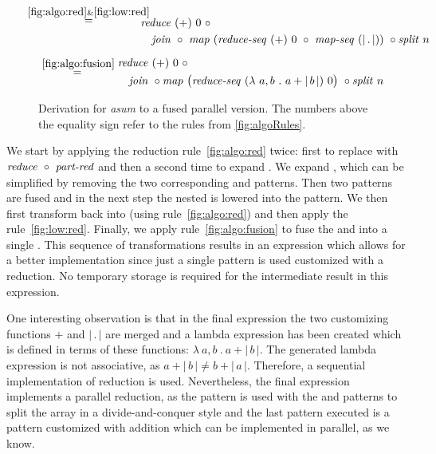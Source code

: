 \begin{figure*}[t]
\begin{align*}
\begin{aligned}
  & \overset{\hspace{-1.3em}\ref{fig:algo:red}\& \ref{fig:low:red}\hspace{-1.1em}}{=\hspace{.2em}}
      \begin{aligned}
        &\\[.5em]
        & \reduce\ (+)\ 0\ \circ\\
        &\quad \join\ \circ\ \map\ (\reduceSeq\ (+)\ 0\ \circ\ \mapSeq\ (|\, .\, |))\ \circ \splitN\ n
      \end{aligned}\\[.5em]
  & \overset{\ref{fig:algo:fusion}}{=\hspace{.2em}}
      \begin{aligned}
        & \reduce\ (+)\ 0\ \circ\\
        &\quad  \join\ \circ \map\ \big(\reduceSeq\ (\lambda\ a, b\ .\ a+|\, b\, |)\ 0\big)\ \circ \splitN\ n
      \end{aligned}
  \end{aligned}
\end{align*}
\caption[Derivation of \emph{asum} to a fused parallel version]{Derivation for \emph{asum} to a fused parallel version.
  The numbers above the equality sign refer to the rules from \autoref{fig:algoRules}.
}
\label{fig:derivation}
\end{figure*}


We start by applying the reduction rule~\ref{fig:algo:red} twice:
first to replace \reduce with $\text{\textit{reduce}}\ \circ\ \text{\textit{part-red}}$ and then a second time to expand \partRed.
We expand \map, which can be simplified by removing the two corresponding \join and \splitN patterns.
Then two \map patterns are fused and in the next step the nested \map is lowered into the \mapSeq pattern.
We then first transform \partRed back into \reduce (using rule~\ref{fig:algo:red}) and then apply the \OpenCL rule~\ref{fig:low:red}.
Finally, we apply rule~\ref{fig:algo:fusion} to fuse the \mapSeq and \reduceSeq into a single \reduceSeq.
This sequence of transformations results in an expression which allows for a better \OpenCL implementation since just a single \map pattern is used customized with a reduction.
No temporary storage is required for the intermediate result in this expression.

One interesting observation is that in the final expression the two customizing functions $+$ and $|\, .\,|$ are merged and a lambda expression has been created which is defined in terms of these functions: $\lambda\ a, b\ .\ a+|\, b\, |$.
The generated lambda expression is not associative, as $a+|\, b\, | \neq b+|\, a\, |$.
Therefore, a sequential implementation of reduction is used.
Nevertheless, the final expression implements a parallel reduction, as the \map pattern is used with the \splitN and \join patterns to split the array in a divide-and-conquer style and the last pattern executed is a \reduce pattern customized with addition which can be implemented in parallel, as we know.



